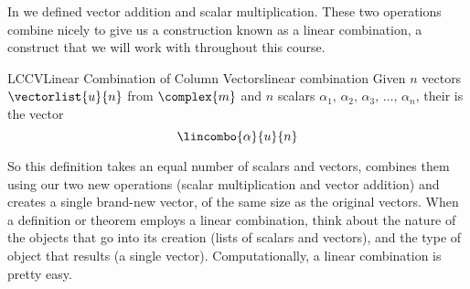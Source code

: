 %
In  we defined vector addition and scalar multiplication.  These two operations combine nicely to give us a construction known as a linear combination, a construct that we will work with throughout this course.
%
%
%
\begin{definition}{LCCV}{Linear Combination of Column Vectors}{linear combination}
Given $n$ vectors $\vectorlist{u}{n}$ from $\complex{m}$ and $n$ scalars $\alpha_1,\,\alpha_2,\,\alpha_3,\,\ldots,\,\alpha_n$, their  is the vector
%
\begin{equation*}
\lincombo{\alpha}{u}{n}
\end{equation*}
%
\end{definition}
%
So this definition takes an equal number of scalars and vectors, combines them using our two new operations (scalar multiplication and vector addition) and creates a single brand-new vector, of the same size as the original vectors.  When a definition or theorem employs a linear combination, think about the nature of the objects that go into its creation (lists of scalars and vectors), and the type of object that results (a single vector).  Computationally, a linear combination is pretty easy.
%
